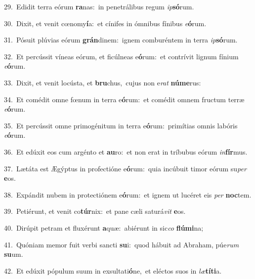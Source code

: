 {\numbfont\textcolor{\numbcolor}{29.}}~Edidit terra eórum \textbf{ra}\-nas:~\star in penetrálibus regum \textit{ip}\-\textbf{só}rum.\par
{\numbfont\textcolor{\numbcolor}{30.}}~Dixit, et venit cœnomy\-\textbf{í}\-a:~\star et cínifes in ómnibus fínibus \textit{e}\-\textbf{ó}rum.\par
{\numbfont\textcolor{\numbcolor}{31.}}~Pósuit plúvias eórum \textbf{grán}\-dinem:~\star ignem comburéntem in terra \textit{ip}\-\textbf{só}rum.\par
{\numbfont\textcolor{\numbcolor}{32.}}~Et percússit víneas eórum, et ficúlneas e\-\textbf{ó}\-rum:~\star et contrívit lignum fínium \textit{e}\-\textbf{ó}rum.\par
{\numbfont\textcolor{\numbcolor}{33.}}~Dixit, et venit locústa, et \textbf{bru}\-chus,~\star cujus non e\textit{rat} \textbf{nú}\-\textbf{me}rus:\par
{\numbfont\textcolor{\numbcolor}{34.}}~Et comédit omne fœnum in terra e\-\textbf{ó}\-rum:~\star et comédit omnem fructum terræ \textit{e}\-\textbf{ó}rum.\par
{\numbfont\textcolor{\numbcolor}{35.}}~Et percússit omne primogénitum in terra e\-\textbf{ó}\-rum:~\star primítias omnis labóris \textit{e}\-\textbf{ó}rum.\par
{\numbfont\textcolor{\numbcolor}{36.}}~Et edúxit eos cum argénto et \textbf{au}\-ro:~\star et non erat in tríbubus eórum \textit{in}\-\textbf{fír}mus.\par
{\numbfont\textcolor{\numbcolor}{37.}}~Lætáta est Ægýptus in profectióne e\-\textbf{ó}\-rum:~\star quia incúbuit timor eórum su\textit{per} \textbf{e}\-os.\par
{\numbfont\textcolor{\numbcolor}{38.}}~Expándit nubem in protectiónem e\-\textbf{ó}\-rum:~\star et ignem ut lucéret eis \textit{per} \textbf{noc}\-tem.\par
{\numbfont\textcolor{\numbcolor}{39.}}~Petiérunt, et venit co\-\textbf{túr}\-nix:~\star et pane cæli saturá\textit{vit} \textbf{e}\-os.\par
{\numbfont\textcolor{\numbcolor}{40.}}~Dirúpit petram et fluxérunt \textbf{a}\-quæ:~\star abiérunt in sic\textit{co} \textbf{flú}\-\textbf{mi}na;\par
{\numbfont\textcolor{\numbcolor}{41.}}~Quóniam memor fuit verbi sancti \textbf{su}\-i:~\star quod hábuit ad Abraham, púe\textit{rum} \textbf{su}\-um.\par
{\numbfont\textcolor{\numbcolor}{42.}}~Et edúxit pópulum suum in exsultati\-\textbf{ó}\-ne,~\star et eléctos suos in \textit{læ}\-\textbf{tí}\textbf{ti}a.\par
